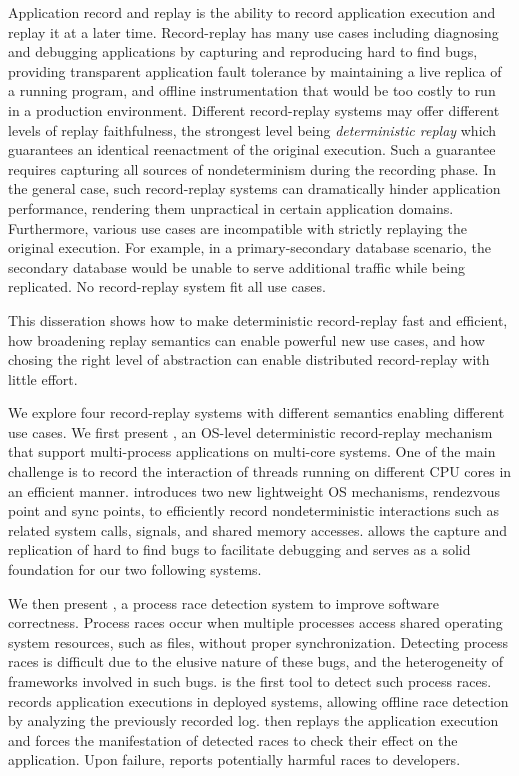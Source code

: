 Application record and replay is the ability to record application execution and
replay it at a later time. Record-replay has many use cases including diagnosing and
debugging applications by capturing and reproducing hard to find bugs, providing
transparent application fault tolerance by maintaining a live replica of a running program,
and offline instrumentation that would be too costly to run in a production environment.
Different record-replay systems may offer different levels of replay faithfulness,
the strongest level being {\em deterministic replay} which guarantees an identical
reenactment of the original execution.
Such a guarantee requires capturing all sources of nondeterminism during the recording
phase. In the general case, such record-replay systems can dramatically hinder
application performance, rendering them unpractical in certain application domains.
Furthermore, various use cases are incompatible with strictly replaying the original execution.
For example, in a primary-secondary database scenario, the secondary database
would be unable to serve additional traffic while being replicated.
No record-replay system fit all use cases.

This disseration shows how to make deterministic record-replay fast and
efficient, how broadening replay semantics can enable powerful new use cases,
and how chosing the right level of abstraction can enable distributed
record-replay with little effort.

We explore four record-replay systems with different semantics enabling different use cases.
We first present \scribe, an OS-level deterministic record-replay mechanism
that support multi-process applications on multi-core systems.
One of the main
challenge is to record the interaction of threads running on different CPU cores
in an efficient manner.
\scribe introduces two new lightweight OS mechanisms, rendezvous point and sync
points, to efficiently record nondeterministic interactions such as related
system calls, signals, and shared memory accesses. \scribe allows the capture
and replication of hard to find bugs to facilitate debugging and serves as a
solid foundation for our two following systems.

We then present \racepro, a process race detection system to improve
software correctness. Process races occur when multiple processes access shared
operating system resources, such as files, without proper synchronization.
Detecting process races is difficult due to the elusive nature of these bugs,
and the heterogeneity of frameworks involved in such bugs.
\racepro is the first tool to detect such process races.
\racepro records application executions in deployed systems, allowing offline
race detection by analyzing the previously recorded log. \racepro then replays
the application execution and forces the manifestation of detected races to check their
effect on the application. Upon failure, \racepro reports potentially harmful
races to developers.

